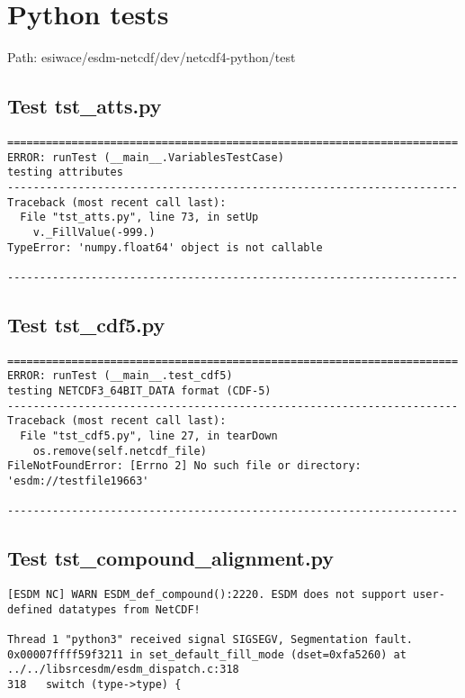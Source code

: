 \chapter{Python tests}

Path: esiwace/esdm-netcdf/dev/netcdf4-python/test

\section{Test tst\_atts.py}

\begin{verbatim}
======================================================================
ERROR: runTest (__main__.VariablesTestCase)
testing attributes
----------------------------------------------------------------------
Traceback (most recent call last):
  File "tst_atts.py", line 73, in setUp
    v._FillValue(-999.)
TypeError: 'numpy.float64' object is not callable

----------------------------------------------------------------------
\end{verbatim}

\section{Test tst\_cdf5.py}

\begin{verbatim}
======================================================================
ERROR: runTest (__main__.test_cdf5)
testing NETCDF3_64BIT_DATA format (CDF-5)
----------------------------------------------------------------------
Traceback (most recent call last):
  File "tst_cdf5.py", line 27, in tearDown
    os.remove(self.netcdf_file)
FileNotFoundError: [Errno 2] No such file or directory: 'esdm://testfile19663'

----------------------------------------------------------------------
\end{verbatim}

\section{Test tst\_compound\_alignment.py}

\begin{verbatim}
[ESDM NC] WARN ESDM_def_compound():2220. ESDM does not support user-defined datatypes from NetCDF!

Thread 1 "python3" received signal SIGSEGV, Segmentation fault.
0x00007ffff59f3211 in set_default_fill_mode (dset=0xfa5260) at ../../libsrcesdm/esdm_dispatch.c:318
318	  switch (type->type) {
\end{verbatim}

